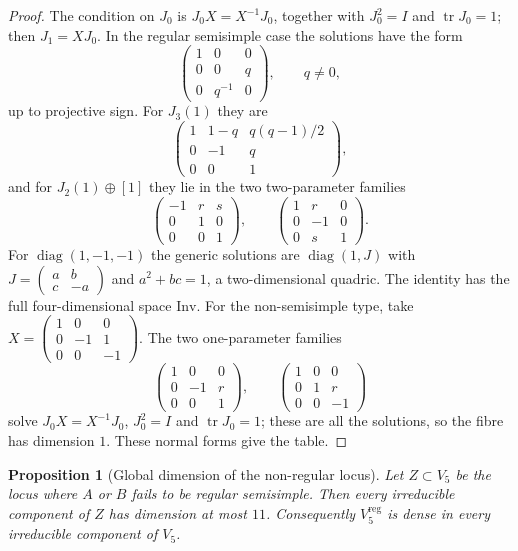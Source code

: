 \documentclass[11pt,a4paper]{article}
\theoremstyle{plain}
\newtheorem{proposition}[theorem]{Proposition}
\theoremstyle{definition}
\theoremstyle{remark}
\newcommand{\tr}{\operatorname{tr}}
\begin{document}
\begin{proof}
The condition on $J_0$ is $J_0X=X^{-1}J_0$, together with $J_0^2=I$ and
$\tr J_0=1$; then $J_1=XJ_0$. In the regular semisimple case the solutions have
the form
\[
 \begin{pmatrix}1&0&0\\0&0&q\\0&q^{-1}&0\end{pmatrix},
 \qquad q\neq0,
\]
up to projective sign. For $J_3(1)$ they are
\[
 \begin{pmatrix}1&1-q&q(q-1)/2\\0&-1&q\\0&0&1\end{pmatrix},
\]
and for $J_2(1)\oplus[1]$ they lie in the two two-parameter families
\[
 \begin{pmatrix}-1&r&s\\0&1&0\\0&0&1\end{pmatrix},\qquad
 \begin{pmatrix}1&r&0\\0&-1&0\\0&s&1\end{pmatrix}.
\]
For $\operatorname{diag}(1,-1,-1)$ the generic solutions are
$\operatorname{diag}(1,J)$ with
$J=\left(\begin{smallmatrix}a&b\\c&-a\end{smallmatrix}\right)$ and
$a^2+bc=1$, a two-dimensional quadric. The identity has the full four-dimensional
space $\mathrm{Inv}$. For the non-semisimple type, take
$X=\left(\begin{smallmatrix}1&0&0\\0&-1&1\\0&0&-1\end{smallmatrix}\right)$.
The two one-parameter families
\[
 \begin{pmatrix}1&0&0\\0&-1&r\\0&0&1\end{pmatrix},\qquad
 \begin{pmatrix}1&0&0\\0&1&r\\0&0&-1\end{pmatrix}
\]
solve $J_0X=X^{-1}J_0$, $J_0^2=I$ and $\tr J_0=1$; these are all the
solutions, so the fibre has dimension $1$. These normal forms give the table.
\end{proof}

\begin{proposition}[Global dimension of the non-regular locus]\label{prop:globaldensity}
Let $Z\subset V_5$ be the locus where $A$ or $B$ fails to be regular semisimple.
Then every irreducible component of $Z$ has dimension at most $11$. Consequently
$V_5^{\mathrm{reg}}$ is dense in every irreducible component of $V_5$.
\end{proposition}
\end{document}
